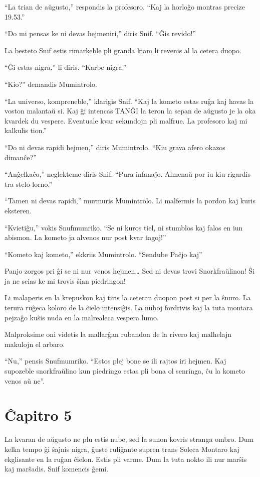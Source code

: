``La trian de aŭgusto,'' respondis la profesoro. ``Kaj la horloĝo montras precize 19.53.''

``Do mi pensas ke ni devas hejmeniri,'' diris Snif. ``Ĝis revido!''

La besteto Snif estis rimarkeble pli granda kiam li revenis al la cetera duopo.

``Ĝi estas nigra,'' li diris. ``Karbe nigra.''

``Kio?'' demandis Mumintrolo.

``La universo, kompreneble,'' klarigis Snif. ``Kaj la kometo estas ruĝa kaj havas la voston malantaŭ si. Kaj ĝi intencas TANĜI la teron la sepan de aŭgusto je la oka kvardek du vespere. Eventuale kvar sekundojn pli malfrue. La profesoro kaj mi kalkulis tion.''

``Do ni devas rapidi hejmen,'' diris Mumintrolo. ``Kiu grava afero okazos dimanĉe?''

``Anĝelkaĉo,'' neglekteme diris Snif. ``Pura infanaĵo. Almenaŭ por iu kiu rigardis tra stelo-lorno.''

``Tamen ni devas rapidi,'' murmuris Mumintrolo. Li malfermis la pordon kaj kuris eksteren.

``Kvietiĝu,'' vokis Snufmumriko. ``Se ni kuros tiel, ni stumblos kaj falos en iun abismon. La kometo ja alvenos nur post kvar tagoj!''

``Kometo kaj kometo,'' ekkriis Mumintrolo. ``Sendube Paĉjo kaj''

Panjo zorgos pri ĝi se ni nur venos hejmen{\ldots} Sed ni devas trovi Snorkfraŭlinon! Ŝi ja ne scias ke mi trovis ŝian piedringon!

Li malaperis en la krepuskon kaj tiris la ceteran duopon post si per la ŝnuro. La terura ruĝeca koloro de la ĉielo intensiĝis. La nuboj fordrivis kaj la tuta montara pejzaĝo kuŝis nuda en la malrealeca vespera lumo.

Malproksime oni videtis la mallarĝan rubandon de la rivero kaj malhelajn makulojn el arbaro.

``Nu,'' pensis Snufmumriko. ``Estos plej bone se ili rajtos iri hejmen. Kaj supozeble snorkfraŭlino kun piedringo estas pli bona ol senringa, ĉu la kometo venos aŭ ne''.

\chapter[Ĉapitro 5]{Ĉapitro 5}

La kvaran de aŭgusto ne plu estis nube, sed la sunon kovris stranga ombro. Dum kelka tempo ĝi ŝajnis nigra, ĝuste ruliĝante supren trans Soleca Montaro kaj ekglisante en la ruĝan ĉielon. Estis pli varme. Dum la tuta nokto ili nur marŝis kaj marŝadis. Snif komencis ĝemi.

